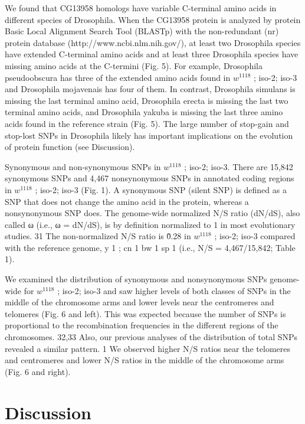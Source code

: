 We found that CG13958 homologs have variable C-terminal amino acids in different species of Drosophila. When the CG13958 protein is analyzed by protein Basic Local Alignment Search Tool (BLASTp) with the non-redundant (nr) protein database (http://www.ncbi.nlm.nih.gov/), at least two Drosophila species have extended C-terminal amino acids and at least three Drosophila species have missing amino acids at the C-termini (Fig. 5). For example, Drosophila pseudoobscura has three of the extended amino acids found in $w^{1118}$ ; iso-2; iso-3 and Drosophila mojavenais has four of them. In contrast, Drosophila simulans is missing the last terminal amino acid, Drosophila erecta is missing the last two terminal amino acids, and Drosophila yakuba is missing the last three amino acids found in the reference strain (Fig. 5). The large number of stop-gain and stop-lost SNPs in Drosophila likely has important implications on the evolution of protein function (see Discussion).

Synonymous and non-synonymous SNPs in $w^{1118}$ ; iso-2; iso-3. There are 15,842 synonymous SNPs and 4,467 nonsynonymous SNPs in annotated coding regions in $w^{1118}$ ; iso-2; iso-3 (Fig. 1). A synonymous SNP (silent SNP) is defined as a SNP that does not change the amino acid in the protein, whereas a nonsynonymous SNP does. The genome-wide normalized N/S ratio (dN/dS), also called ω (i.e., ω = dN/dS), is by definition normalized to 1 in most evolutionary studies. 31 The non-normalized N/S ratio is \~0.28 in $w^{1118}$ ; iso-2; iso-3 compared with the reference genome, y 1 ; cn 1 bw 1 sp 1 (i.e., N/S = 4,467/15,842; Table 1).

We examined the distribution of synonymous and nonsynonymous SNPs genome-wide for $w^{1118}$ ; iso-2; iso-3 and saw higher levels of both classes of SNPs in the middle of the chromosome arms and lower levels near the centromeres and telomeres (Fig.  6 and left). This was expected because the number of SNPs is proportional to the recombination frequencies in the different regions of the chromosomes. 32,33 Also, our previous analyses of the distribution of total SNPs revealed a similar pattern. 1 We observed higher N/S ratios near the telomeres and centromeres and lower N/S ratios in the middle of the chromosome arms (Fig.  6 and right).

\section{Discussion}

